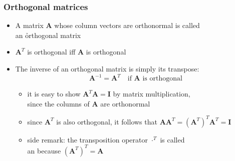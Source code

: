 \begin{frame}
  \frametitle{Orthogonal matrices} 

  \begin{itemize}
  \item A matrix $\mathbf{A}$ whose column vectors are orthonormal is called\\
    an \h{orthogonal} matrix
  \item $\mathbf{A}^T$ is orthogonal iff $\mathbf{A}$ is orthogonal%
    \pause\gap
  \item The \h{inverse} of an orthogonal matrix is simply its transpose:
    \[
    \mathbf{A}^{-1} = \mathbf{A}^T \quad \text{if $\mathbf{A}$ is orthogonal}
    \]
    \ungap[1]
    \begin{itemize}
    \item it is easy to show $\mathbf{A}^T \mathbf{A} = \mathbf{I}$ by matrix
      multiplication,\\ since the columns of $\mathbf{A}$ are orthonormal
    \item since $\mathbf{A}^T$ is also orthogonal, it follows that $\mathbf{A}
      \mathbf{A}^T = (\mathbf{A}^T)^T \mathbf{A}^T = \mathbf{I}$
    \item side remark: the transposition operator $\cdot^T$ is called\\
      an  because $(\mathbf{A}^T)^T = \mathbf{A}$
    \end{itemize}
  \end{itemize}
\end{frame}

